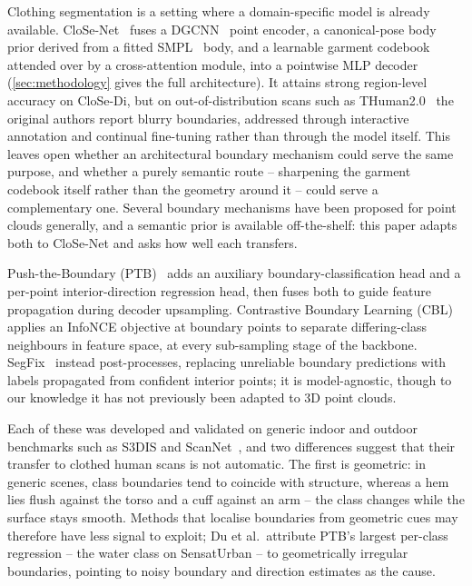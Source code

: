 \documentclass{article}
\theoremstyle{plain}
\theoremstyle{definition}
\theoremstyle{remark}
\begin{document}
Clothing segmentation is a setting where a domain-specific model is already
available. CloSe-Net~\cite{antic2024close} fuses a DGCNN~\cite{wang2019dynamicgraphcnnlearning}
point encoder, a canonical-pose body prior derived from a fitted
SMPL~\cite{SMPL:2015} body, and a learnable garment codebook attended over by
a cross-attention module, into a pointwise MLP decoder (\cref{sec:methodology}
gives the full architecture). It attains strong region-level accuracy on
CloSe-Di, but on out-of-distribution scans such as THuman2.0~\cite{tao2021function4d}
the original authors report blurry boundaries, addressed through interactive
annotation and continual fine-tuning rather than through the model itself.
This leaves open whether an architectural boundary mechanism could serve the
same purpose, and whether a purely semantic route -- sharpening the garment
codebook itself rather than the geometry around it -- could serve a
complementary one. Several boundary mechanisms have been proposed for point
clouds generally, and a semantic prior is available off-the-shelf: this paper
adapts both to CloSe-Net and asks how well each transfers.

Push-the-Boundary (PTB)~\cite{Du_2022} adds an auxiliary boundary-classification
head and a per-point interior-direction regression head, then fuses both to guide
feature propagation during decoder upsampling. Contrastive Boundary Learning
(CBL)~\cite{tang2022contrastive} applies an InfoNCE objective at boundary
points to separate differing-class neighbours in feature space, at every
sub-sampling stage of the backbone. SegFix~\cite{yuan2020segfixmodelagnosticboundaryrefinement}
instead post-processes, replacing unreliable boundary predictions with labels
propagated from confident interior points; it is model-agnostic, though to our
knowledge it has not previously been adapted to 3D point clouds.

Each of these was developed and validated on generic indoor and outdoor
benchmarks such as S3DIS and ScanNet~\cite{dai2017scannet}, and two
differences suggest that their transfer to clothed human scans is not
automatic. The first is geometric: in generic scenes, class boundaries tend to
coincide with structure, whereas a hem lies flush against the torso and a cuff
against an arm -- the class changes while the surface stays smooth. Methods
that localise boundaries from geometric cues may therefore have less signal to
exploit; Du et al.\ attribute PTB's largest per-class regression -- the water
class on SensatUrban -- to geometrically irregular boundaries, pointing to
noisy boundary and direction estimates as the cause.
\end{document}
